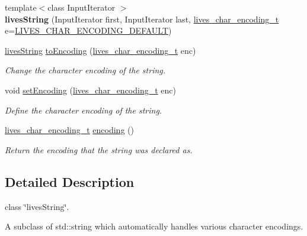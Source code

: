 \begin{DoxyCompactItemize}
\item 
\hypertarget{classlives_1_1livesString_a60c109df1843d607dcfc706acaf06106}{{\footnotesize template$<$class Input\-Iterator $>$ }\\{\bfseries lives\-String} (Input\-Iterator first, Input\-Iterator last, \hyperlink{liblives_8hpp_ac7022da9e6d00c731395516feb5dc3e5}{lives\-\_\-char\-\_\-encoding\-\_\-t} e=\hyperlink{liblives_8hpp_aa725ee775f37908fca65f712c202b6c9}{L\-I\-V\-E\-S\-\_\-\-C\-H\-A\-R\-\_\-\-E\-N\-C\-O\-D\-I\-N\-G\-\_\-\-D\-E\-F\-A\-U\-L\-T})}\label{classlives_1_1livesString_a60c109df1843d607dcfc706acaf06106}

\item 
\hyperlink{classlives_1_1livesString}{lives\-String} \hyperlink{classlives_1_1livesString_a26e5c709b1ccc19f09997e70dbd64284}{to\-Encoding} (\hyperlink{liblives_8hpp_ac7022da9e6d00c731395516feb5dc3e5}{lives\-\_\-char\-\_\-encoding\-\_\-t} enc)
\begin{DoxyCompactList}\small\item\em Change the character encoding of the string. \end{DoxyCompactList}\item 
void \hyperlink{classlives_1_1livesString_a8dc089efbebeb250a2427722447626a9}{set\-Encoding} (\hyperlink{liblives_8hpp_ac7022da9e6d00c731395516feb5dc3e5}{lives\-\_\-char\-\_\-encoding\-\_\-t} enc)
\begin{DoxyCompactList}\small\item\em Define the character encoding of the string. \end{DoxyCompactList}\item 
\hyperlink{liblives_8hpp_ac7022da9e6d00c731395516feb5dc3e5}{lives\-\_\-char\-\_\-encoding\-\_\-t} \hyperlink{classlives_1_1livesString_ae4b4cdac9f59eb13697b42bf9d97cdfa}{encoding} ()
\begin{DoxyCompactList}\small\item\em Return the encoding that the string was declared as. \end{DoxyCompactList}\end{DoxyCompactItemize}


\subsection{Detailed Description}
class \char`\"{}lives\-String\char`\"{}. 

A subclass of std\-::string which automatically handles various character encodings. 

